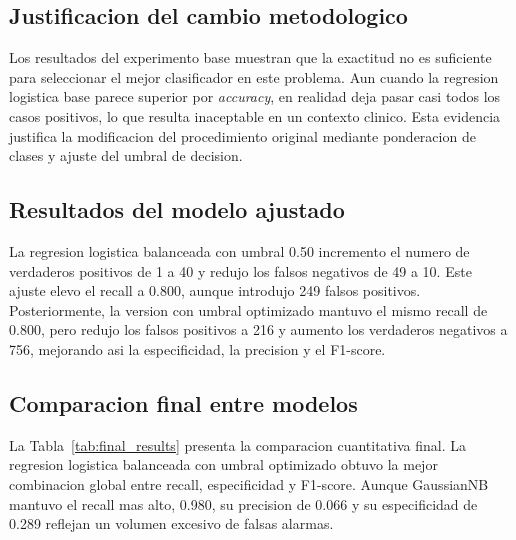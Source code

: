 \documentclass[conference]{IEEEtran}
\begin{document}
\subsection{Justificacion del cambio metodologico}
Los resultados del experimento base muestran que la exactitud no es suficiente para seleccionar el mejor clasificador en este problema. Aun cuando la regresion logistica base parece superior por \textit{accuracy}, en realidad deja pasar casi todos los casos positivos, lo que resulta inaceptable en un contexto clinico. Esta evidencia justifica la modificacion del procedimiento original mediante ponderacion de clases y ajuste del umbral de decision.

\subsection{Resultados del modelo ajustado}
La regresion logistica balanceada con umbral 0.50 incremento el numero de verdaderos positivos de 1 a 40 y redujo los falsos negativos de 49 a 10. Este ajuste elevo el recall a 0.800, aunque introdujo 249 falsos positivos. Posteriormente, la version con umbral optimizado mantuvo el mismo recall de 0.800, pero redujo los falsos positivos a 216 y aumento los verdaderos negativos a 756, mejorando asi la especificidad, la precision y el F1-score.

\subsection{Comparacion final entre modelos}
La Tabla~\ref{tab:final_results} presenta la comparacion cuantitativa final. La regresion logistica balanceada con umbral optimizado obtuvo la mejor combinacion global entre recall, especificidad y F1-score. Aunque GaussianNB mantuvo el recall mas alto, 0.980, su precision de 0.066 y su especificidad de 0.289 reflejan un volumen excesivo de falsas alarmas.

\begin{table}[htbp]
\caption{Comparacion final entre modelos}
\label{tab:final_results}
\centering
{}
\end{table}
\end{document}
